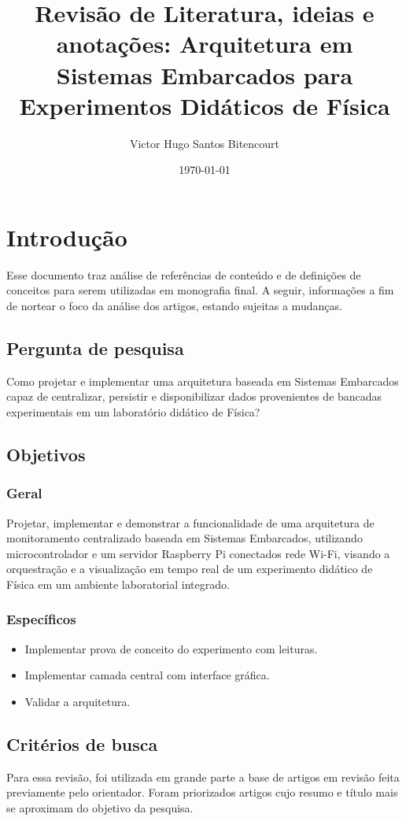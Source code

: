 \documentclass{article}
\title{Revisão de Literatura, ideias e anotações: Arquitetura em Sistemas Embarcados para Experimentos Didáticos de Física}
\author{Victor Hugo Santos Bitencourt}
\date{\today}
\begin{document}
\maketitle

\section{Introdução}
Esse documento traz análise de referências de conteúdo e de definições de conceitos para serem utilizadas em monografia final. A seguir, informações a fim de nortear o foco da análise dos artigos, estando sujeitas a mudanças.

\subsection{Pergunta de pesquisa}
Como projetar e implementar uma arquitetura baseada em Sistemas Embarcados capaz de centralizar, persistir e disponibilizar dados provenientes de bancadas experimentais em um laboratório didático de Física?

\subsection{Objetivos}

\subsubsection{Geral}
Projetar, implementar e demonstrar a funcionalidade de uma arquitetura de monitoramento centralizado baseada em Sistemas Embarcados, utilizando microcontrolador e um servidor Raspberry Pi conectados rede Wi-Fi, visando a orquestração e a visualização em tempo real de um experimento didático de Física em um ambiente laboratorial integrado.

\subsubsection{Específicos}
\begin{itemize}
	\item Implementar prova de conceito do experimento com leituras.
	\item Implementar camada central com interface gráfica.
	\item Validar a arquitetura.
\end{itemize}

\subsection{Critérios de busca}
Para essa revisão, foi utilizada em grande parte a base de artigos em revisão feita previamente pelo orientador. Foram priorizados artigos cujo resumo e título mais se aproximam do objetivo da pesquisa.
\end{document}
